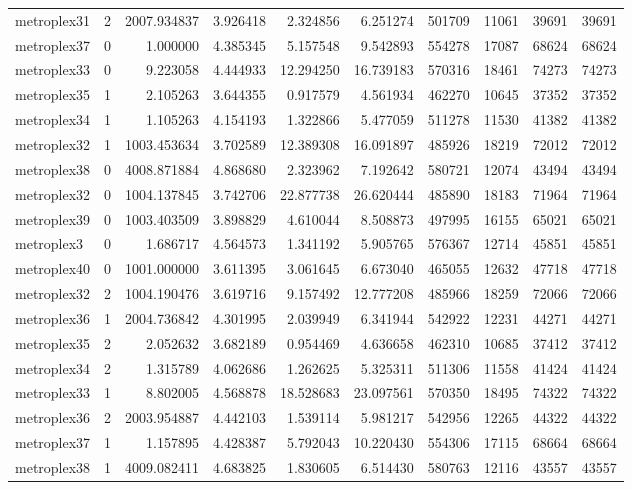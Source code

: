 \documentclass[../../../thesis.tex]{subfiles}
\begin{document}
\begin{longtable}{|l|r|r|r|r|r|r|r|r|r|}
metroplex31 & 2 & 2007.934837 & 3.926418 & 2.324856 & 6.251274 & 501709 & 11061 & 39691 & 39691 \\
metroplex37 & 0 & 1.000000 & 4.385345 & 5.157548 & 9.542893 & 554278 & 17087 & 68624 & 68624 \\
metroplex33 & 0 & 9.223058 & 4.444933 & 12.294250 & 16.739183 & 570316 & 18461 & 74273 & 74273 \\
metroplex35 & 1 & 2.105263 & 3.644355 & 0.917579 & 4.561934 & 462270 & 10645 & 37352 & 37352 \\
metroplex34 & 1 & 1.105263 & 4.154193 & 1.322866 & 5.477059 & 511278 & 11530 & 41382 & 41382 \\
metroplex32 & 1 & 1003.453634 & 3.702589 & 12.389308 & 16.091897 & 485926 & 18219 & 72012 & 72012 \\
metroplex38 & 0 & 4008.871884 & 4.868680 & 2.323962 & 7.192642 & 580721 & 12074 & 43494 & 43494 \\
metroplex32 & 0 & 1004.137845 & 3.742706 & 22.877738 & 26.620444 & 485890 & 18183 & 71964 & 71964 \\
metroplex39 & 0 & 1003.403509 & 3.898829 & 4.610044 & 8.508873 & 497995 & 16155 & 65021 & 65021 \\
metroplex3 & 0 & 1.686717 & 4.564573 & 1.341192 & 5.905765 & 576367 & 12714 & 45851 & 45851 \\
metroplex40 & 0 & 1001.000000 & 3.611395 & 3.061645 & 6.673040 & 465055 & 12632 & 47718 & 47718 \\
metroplex32 & 2 & 1004.190476 & 3.619716 & 9.157492 & 12.777208 & 485966 & 18259 & 72066 & 72066 \\
metroplex36 & 1 & 2004.736842 & 4.301995 & 2.039949 & 6.341944 & 542922 & 12231 & 44271 & 44271 \\
metroplex35 & 2 & 2.052632 & 3.682189 & 0.954469 & 4.636658 & 462310 & 10685 & 37412 & 37412 \\
metroplex34 & 2 & 1.315789 & 4.062686 & 1.262625 & 5.325311 & 511306 & 11558 & 41424 & 41424 \\
metroplex33 & 1 & 8.802005 & 4.568878 & 18.528683 & 23.097561 & 570350 & 18495 & 74322 & 74322 \\
metroplex36 & 2 & 2003.954887 & 4.442103 & 1.539114 & 5.981217 & 542956 & 12265 & 44322 & 44322 \\
metroplex37 & 1 & 1.157895 & 4.428387 & 5.792043 & 10.220430 & 554306 & 17115 & 68664 & 68664 \\
metroplex38 & 1 & 4009.082411 & 4.683825 & 1.830605 & 6.514430 & 580763 & 12116 & 43557 & 43557 \\

\end{longtable}
\end{document}

